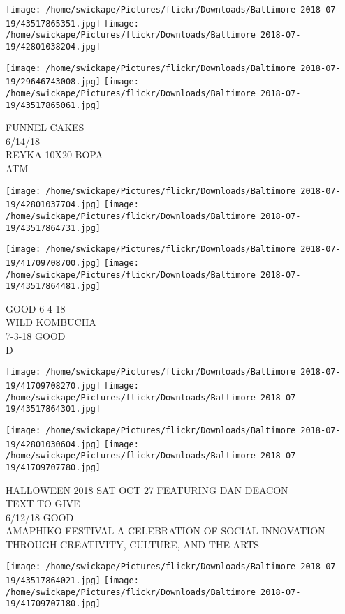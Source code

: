 \documentclass[10pt,letterpaper]{article}
\begin{document}
\texttt{[image: /home/swickape/Pictures/flickr/Downloads/Baltimore 2018-07-19/43517865351.jpg]}
\texttt{[image: /home/swickape/Pictures/flickr/Downloads/Baltimore 2018-07-19/42801038204.jpg]}

\texttt{[image: /home/swickape/Pictures/flickr/Downloads/Baltimore 2018-07-19/29646743008.jpg]}
\texttt{[image: /home/swickape/Pictures/flickr/Downloads/Baltimore 2018-07-19/43517865061.jpg]}

FUNNEL CAKES\\
6/14/18\\
REYKA 10X20 BOPA\\
ATM
\pagebreak

\texttt{[image: /home/swickape/Pictures/flickr/Downloads/Baltimore 2018-07-19/42801037704.jpg]}
\texttt{[image: /home/swickape/Pictures/flickr/Downloads/Baltimore 2018-07-19/43517864731.jpg]}

\texttt{[image: /home/swickape/Pictures/flickr/Downloads/Baltimore 2018-07-19/41709708700.jpg]}
\texttt{[image: /home/swickape/Pictures/flickr/Downloads/Baltimore 2018-07-19/43517864481.jpg]}

GOOD 6{-}4{-}18\\
WILD KOMBUCHA\\
7{-}3{-}18 GOOD\\
D
\pagebreak

\texttt{[image: /home/swickape/Pictures/flickr/Downloads/Baltimore 2018-07-19/41709708270.jpg]}
\texttt{[image: /home/swickape/Pictures/flickr/Downloads/Baltimore 2018-07-19/43517864301.jpg]}

\texttt{[image: /home/swickape/Pictures/flickr/Downloads/Baltimore 2018-07-19/42801030604.jpg]}
\texttt{[image: /home/swickape/Pictures/flickr/Downloads/Baltimore 2018-07-19/41709707780.jpg]}

HALLOWEEN 2018 SAT OCT 27 FEATURING DAN DEACON\\
TEXT TO GIVE\\
6/12/18 GOOD\\
AMAPHIKO FESTIVAL A CELEBRATION OF SOCIAL INNOVATION THROUGH CREATIVITY, CULTURE, AND THE ARTS
\pagebreak

\texttt{[image: /home/swickape/Pictures/flickr/Downloads/Baltimore 2018-07-19/43517864021.jpg]}
\texttt{[image: /home/swickape/Pictures/flickr/Downloads/Baltimore 2018-07-19/41709707180.jpg]}
\end{document}
